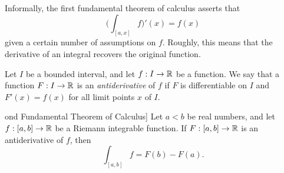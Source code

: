 \begin{note}
  Informally, the first fundamental theorem of calculus asserts that
  \[
    \bigg(\int_{[a, x]} f\bigg)'(x) = f(x)
  \]
  given a certain number of assumptions on \(f\).
  Roughly, this means that the derivative of an integral recovers the original function.
\end{note}

\setcounter{thm}{2}
\begin{defn}[Antiderivatives]\label{i:11.9.3}
  Let \(I\) be a bounded interval, and let \(f : I \to \mathbb{R}\) be a function.
  We say that a function \(F : I \to \mathbb{R}\) is an \emph{antiderivative} of \(f\) if \(F\) is differentiable on \(I\) and \(F'(x) = f(x)\) for all limit points \(x\) of \(I\).
\end{defn}

\begin{thm}ond Fundamental Theorem of Calculus]\label{i:11.9.4}
  Let \(a < b\) be real numbers, and let \(f : [a, b] \to \mathbb{R}\) be a Riemann integrable function.
  If \(F : [a, b] \to \mathbb{R}\) is an antiderivative of \(f\), then
  \[
    \int_{[a, b]} f = F(b) - F(a).
  \]
\end{thm}

